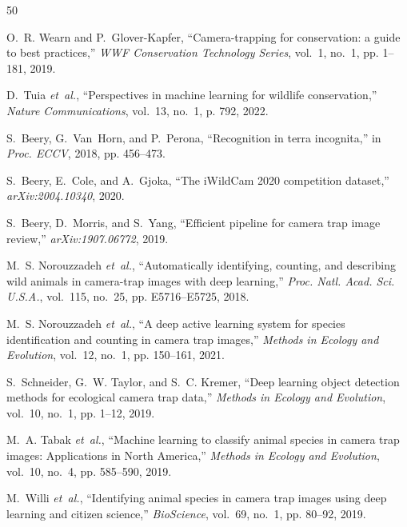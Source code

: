\documentclass[conference]{IEEEtran}
\begin{document}

\begin{thebibliography}{50}
\sloppy
\setlength{\itemsep}{0.0pt plus 0.1pt}
\setlength{\parskip}{0pt}

O.~R. Wearn and P.~Glover-Kapfer, ``Camera-trapping for conservation: a guide to best practices,'' \emph{WWF Conservation Technology Series}, vol.~1, no.~1, pp. 1--181, 2019.

D.~Tuia \emph{et~al.}, ``Perspectives in machine learning for wildlife conservation,'' \emph{Nature Communications}, vol.~13, no.~1, p. 792, 2022.

S.~Beery, G.~Van~Horn, and P.~Perona, ``Recognition in terra incognita,'' in \emph{Proc. ECCV}, 2018, pp. 456--473.

S.~Beery, E.~Cole, and A.~Gjoka, ``The iWildCam 2020 competition dataset,'' \emph{arXiv:2004.10340}, 2020.

S.~Beery, D.~Morris, and S.~Yang, ``Efficient pipeline for camera trap image review,'' \emph{arXiv:1907.06772}, 2019.

M.~S. Norouzzadeh \emph{et~al.}, ``Automatically identifying, counting, and describing wild animals in camera-trap images with deep learning,'' \emph{Proc. Natl. Acad. Sci. U.S.A.}, vol.~115, no.~25, pp. E5716--E5725, 2018.

M.~S. Norouzzadeh \emph{et~al.}, ``A deep active learning system for species identification and counting in camera trap images,'' \emph{Methods in Ecology and Evolution}, vol.~12, no.~1, pp. 150--161, 2021.

S.~Schneider, G.~W. Taylor, and S.~C. Kremer, ``Deep learning object detection methods for ecological camera trap data,'' \emph{Methods in Ecology and Evolution}, vol.~10, no.~1, pp. 1--12, 2019.

M.~A. Tabak \emph{et~al.}, ``Machine learning to classify animal species in camera trap images: Applications in North America,'' \emph{Methods in Ecology and Evolution}, vol.~10, no.~4, pp. 585--590, 2019.

M.~Willi \emph{et~al.}, ``Identifying animal species in camera trap images using deep learning and citizen science,'' \emph{BioScience}, vol.~69, no.~1, pp. 80--92, 2019.


\end{thebibliography}
\end{document}
